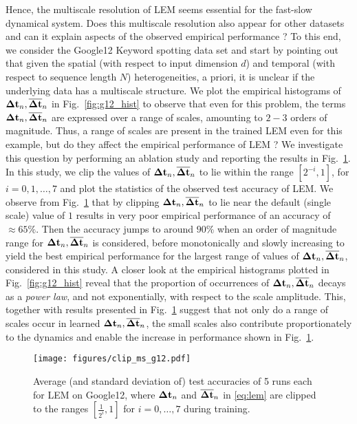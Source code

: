 \documentclass{article} \usepackage{iclr2022_conference,times}
\newcommand{\Dt}{{\Delta t}}
\newcommand{\fref}[1] {Fig.~\ref{#1}}
\begin{document}
Hence, the multiscale resolution of LEM seems essential for the fast-slow dynamical system. Does this multiscale resolution also appear for other datasets and can it explain aspects of the observed empirical performance ? To this end, we consider the Google12 Keyword spotting data set and start by pointing out that given the spatial (with respect to input dimension $d$) and temporal (with respect to sequence length $N$) heterogeneities, a priori, it is unclear if the underlying data has a multiscale structure. We plot the empirical histograms of ${\bf \Dt}_n,\overline{\bf \Dt}_n$ in \fref{fig:g12_hist} to observe that even for this problem, the terms ${\bf \Dt}_n,\overline{\bf \Dt}_n$ are expressed over a range of scales, amounting to $2-3$ orders of magnitude. Thus, a range of scales are present in the trained LEM even for this example, but do they affect the empirical performance of LEM ? We investigate this question by performing an ablation study and reporting the results in \fref{fig:clip_ms_g12}. In this study, we clip the values of ${\bf \Dt}_n,\overline{\bf \Dt}_n$ to lie within the range $[2^{-i},1]$, for $i=0,1,\ldots,7$ and plot the statistics of the observed test accuracy of LEM. We observe from \fref{fig:clip_ms_g12} that by clipping  ${\bf \Dt}_n,\overline{\bf \Dt}_n$ to lie near the default (single scale) value of $1$ results in very poor empirical performance of an accuracy of $\approx 65\%$. Then the accuracy jumps to around $90\%$ when an order of magnitude range for  ${\bf \Dt}_n,\overline{\bf \Dt}_n$ is considered, before monotonically and slowly increasing to yield the best empirical performance for the largest range of values of  ${\bf \Dt}_n,\overline{\bf \Dt}_n$, considered in this study. A closer look at the empirical histograms plotted in \fref{fig:g12_hist} reveal that the proportion of occurrences of ${\bf \Dt}_n,\overline{\bf \Dt}_n$ decays as a \emph{power law}, and not exponentially, with respect to the scale amplitude. This, together with results presented in \fref{fig:clip_ms_g12} suggest that not only do a range of scales occur in learned ${\bf \Dt}_n,\overline{\bf \Dt}_n$, the small scales also contribute proportionately to the dynamics and enable the increase in performance shown in \fref{fig:clip_ms_g12}.  
\begin{figure}[ht!]
\centering
\texttt{[image: figures/clip\_ms\_g12.pdf]}
\caption{Average (and standard deviation of) test accuracies of 5 runs each for LEM on Google12, where ${\bf \Dt}_n$ and ${\bf \overline{\Dt}}_n$ in \eqref{eq:lem} are clipped to the ranges $[\frac{1}{2^{i}},1]$ for $i=0,\dots,7$ during training.}
\label{fig:clip_ms_g12}
\end{figure}
\end{document}
